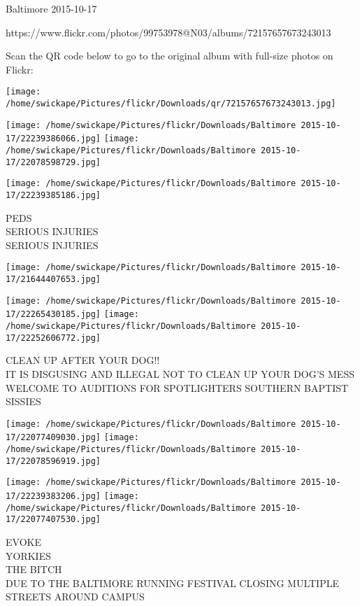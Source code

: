 \documentclass[10pt,letterpaper]{article}
\begin{document}
Baltimore 2015-10-17

https://www.flickr.com/photos/99753978@N03/albums/72157657673243013

Scan the QR code below to go to the original album with full-size photos on Flickr:

\texttt{[image: /home/swickape/Pictures/flickr/Downloads/qr/72157657673243013.jpg]}
\pagebreak

\texttt{[image: /home/swickape/Pictures/flickr/Downloads/Baltimore 2015-10-17/22239386066.jpg]}
\texttt{[image: /home/swickape/Pictures/flickr/Downloads/Baltimore 2015-10-17/22078598729.jpg]}

\texttt{[image: /home/swickape/Pictures/flickr/Downloads/Baltimore 2015-10-17/22239385186.jpg]}

PEDS\\
SERIOUS INJURIES\\
SERIOUS INJURIES
\pagebreak

\texttt{[image: /home/swickape/Pictures/flickr/Downloads/Baltimore 2015-10-17/21644407653.jpg]}

\vspace{0.25in}
\texttt{[image: /home/swickape/Pictures/flickr/Downloads/Baltimore 2015-10-17/22265430185.jpg]}
\texttt{[image: /home/swickape/Pictures/flickr/Downloads/Baltimore 2015-10-17/22252606772.jpg]}

CLEAN UP AFTER YOUR DOG!!\\
IT IS DISGUSING AND ILLEGAL NOT TO CLEAN UP YOUR DOG'S MESS\\
WELCOME TO AUDITIONS FOR SPOTLIGHTERS SOUTHERN BAPTIST SISSIES
\pagebreak

\texttt{[image: /home/swickape/Pictures/flickr/Downloads/Baltimore 2015-10-17/22077409030.jpg]}
\texttt{[image: /home/swickape/Pictures/flickr/Downloads/Baltimore 2015-10-17/22078596919.jpg]}

\texttt{[image: /home/swickape/Pictures/flickr/Downloads/Baltimore 2015-10-17/22239383206.jpg]}
\texttt{[image: /home/swickape/Pictures/flickr/Downloads/Baltimore 2015-10-17/22077407530.jpg]}

EVOKE\\
YORKIES\\
THE BITCH\\
DUE TO THE BALTIMORE RUNNING FESTIVAL CLOSING MULTIPLE STREETS AROUND CAMPUS
\pagebreak
\end{document}
